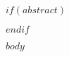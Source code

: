 \documentclass[10pt]{book}
\begin{document}
$if(abstract)$
\begin{abstract}
$abstract$
\end{abstract}
$endif$

$body$
\end{document}
